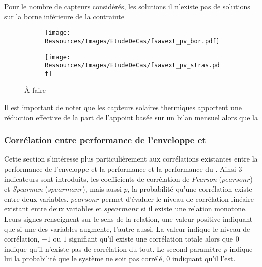 Pour le nombre de capteurs  considérés, les solutions  il n’existe pas de solutions
sur la borne inférieure de la contrainte



\begin{figure}
    \centering
    \begin{subfigure}[b]{0.48\textwidth}
        \centering
        \texttt{[image: Ressources/Images/EtudeDeCas/fsavext\_pv\_bor.pdf]}
        \caption{}
        \label{fig:fsav_pv_bor}
    \end{subfigure}
    \quad
    \begin{subfigure}[b]{0.48\textwidth}
        \centering
        \texttt{[image: Ressources/Images/EtudeDeCas/fsavext\_pv\_stras.pdf]}
        \caption{}
        \label{fig:fsav_pv_stras}
    \end{subfigure}
    \caption[À faire]
             {À faire}
    \label{fig:fsav_pv_bor_stras}
\end{figure}




Il est important de noter que les capteurs solaires thermiques
apportent une réduction
effective de la part de l’appoint basée sur un bilan mensuel alors que la



\subsubsection{Corrélation entre performance de l’enveloppe et } %
\label{ssub:correlation_entre_performance_de_l_enveloppe_et_ssc}
Cette section s’intéresse plus particulièrement aux corrélations existantes entre la
performance de l’enveloppe et la performance et la performance du . Ainsi $3$
indicateurs sont introduits, les coefficients de corrélation de \textit{Pearson}
($pearsonr$) et \textit{Spearman} ($spearmanr$), mais aussi $p$, la probabilité qu’une
corrélation existe entre deux variables. $pearsonr$ permet d’évaluer le niveau de
corrélation linéaire existant entre deux variables et $spearmanr$ si il existe une
relation monotone. Leurs signes renseignent sur le sens de la relation, une valeur
positive indiquant que si une des variables augmente, l’autre aussi. La valeur indique le
niveau de corrélation, $-1$ ou $1$ signifiant qu’il existe une corrélation totale alors
que $0$ indique qu’il n’existe pas de corrélation du tout. Le second paramètre $p$ indique
lui la probabilité que le système ne soit pas corrélé, $0$ indiquant qu’il l’est.

